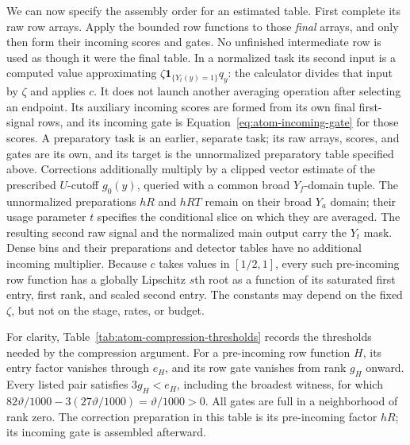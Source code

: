 We can now specify the assembly order for an estimated table. First complete its raw row arrays. Apply the bounded row functions to those \emph{final} arrays, and only then form their incoming scores and gates. No unfinished intermediate row is used as though it were the final table.  In a normalized task its second input is a
computed value approximating $\zeta\mathbf1_{\{Y_t(y)=1\}}q_y$: the
calculator divides that input by $\zeta$ and applies $c$.  It does not launch another averaging
operation after selecting an endpoint.  Its auxiliary incoming scores
are formed from its own final first-signal rows, and its incoming gate
is Equation~\eqref{eq:atom-incoming-gate} for those scores.  A preparatory
task is an earlier, separate task; its raw arrays, scores, and gates are
its own, and its target is the unnormalized preparatory table specified
above.  Corrections additionally multiply by a clipped vector estimate
of the prescribed $U$-cutoff $g_0(y)$, queried with a common broad
$Y_f$-domain tuple.  The unnormalized preparations $hR$ and $hRT$
remain on their broad $Y_a$ domain; their usage parameter $t$ specifies
the conditional slice on which they are averaged.  The resulting
second raw signal and the normalized main output carry the $Y_t$ mask.
Dense bins and their preparations and detector tables have
no additional incoming multiplier.
Because $c$ takes values in $[1/2,1]$, every such pre-incoming row
function has a globally Lipschitz $s$th root as a function of its
saturated first entry, first rank, and scaled second entry.  The constants
may depend on the fixed $\zeta$, but not on the stage, rates, or budget.

For clarity, Table~\ref{tab:atom-compression-thresholds} records the
thresholds needed by the compression argument.  For a pre-incoming row
function $H$, its entry factor vanishes through $e_H$, and its row gate
vanishes from rank $g_H$ onward.  Every listed pair satisfies
$3g_H<e_H$, including the broadest witness, for which
$82\vartheta/1000-3(27\vartheta/1000)=\vartheta/1000>0$.
All gates are full in a neighborhood of rank zero.  The correction
preparation in this table is its pre-incoming factor $hR$; its incoming
gate is assembled afterward.

